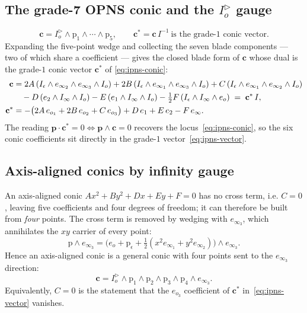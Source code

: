 \documentclass{birkjour}
\theoremstyle{definition}
\theoremstyle{remark}
\newcommand{\eo}{e_o}
\newcommand{\einf}{e_\infty}
\newcommand{\Iod}{I_o^{\triangleright}}      %
\newcommand{\Io}{I_o}
\newcommand{\Iinf}{I_\infty}
\newcommand{\joinp}{\wedge}
\begin{document}
\subsection{The grade-7 OPNS conic and the $\Iod$ gauge}
\begin{equation}\label{eq:opns-conic}
  \mathbf{c} = \Iod \joinp \mathrm{p}_1 \joinp \cdots \joinp \mathrm{p}_5,
  \qquad \mathbf{c}^{*} = \mathbf{c}\,I^{-1}\ \text{is the grade-1 conic vector}.
\end{equation}
Expanding the five-point wedge and collecting the seven blade components --- two
of which share a coefficient --- gives the closed blade form of $\mathbf{c}$
whose dual is the grade-$1$ conic vector $\mathbf{c}^{*}$ of
\cref{eq:ipns-conic}:
\begin{align}\label{eq:opns-blade-form}
  \mathbf{c}
  &= 2A\,(I_\epsilon \joinp e_{\infty_2}\joinp e_{\infty_3}\joinp \Io)
   + 2B\,(I_\epsilon \joinp e_{\infty_1}\joinp e_{\infty_3}\joinp \Io)
   + C\,(I_\epsilon \joinp e_{\infty_1}\joinp e_{\infty_2}\joinp \Io) \notag\\
  &\quad
   - D\,(e_2 \joinp \Iinf \joinp \Io)
   - E\,(e_1 \joinp \Iinf \joinp \Io)
   - \tfrac12 F\,(I_\epsilon \joinp \Iinf \joinp \eo)
   \;=\; \mathbf{c}^{*}\,I,\\
  \mathbf{c}^{*}
  &= -\big(2A\,e_{o_1} + 2B\,e_{o_2} + C\,e_{o_3}\big)
     + D\,e_1 + E\,e_2 - F\,\einf .
  \label{eq:ipns-vector}
\end{align}
The reading $\mathbf{p}\cdot\mathbf{c}^{*}=0 \iff \mathbf{p}\wedge\mathbf{c}=0$
recovers the locus~\eqref{eq:ipns-conic}, so the six conic coefficients sit
directly in the grade-$1$ vector~\eqref{eq:ipns-vector}.

\subsection{Axis-aligned conics by infinity gauge}
\label{sec:axis-aligned}
An axis-aligned conic $A x^2 + B y^2 + D x + E y + F = 0$ has no cross term, i.e.
$C=0$, leaving five coefficients and four degrees of freedom; it can therefore be
built from \emph{four} points. The cross term is removed by wedging with
$e_{\infty_3}$, which annihilates the $xy$ carrier of every point:
\begin{equation}\label{eq:point-wedge-einf3}
  \mathrm{p}\joinp e_{\infty_3}
  = \big(\eo + \mathrm{p}_\epsilon
       + \tfrac12(x^2 e_{\infty_1}+y^2 e_{\infty_2})\big)\joinp e_{\infty_3}.
\end{equation}
Hence an axis-aligned conic is a general conic with four points sent to the
$e_{\infty_3}$ direction:
\begin{equation}\label{eq:axis-aligned-conic}
  \mathbf{c} = \Iod \joinp \mathrm{p}_1 \joinp \mathrm{p}_2 \joinp \mathrm{p}_3
                    \joinp \mathrm{p}_4 \joinp e_{\infty_3}.
\end{equation}
Equivalently, $C=0$ is the statement that the $e_{o_3}$ coefficient of
$\mathbf{c}^{*}$ in~\eqref{eq:ipns-vector} vanishes.
\end{document}
